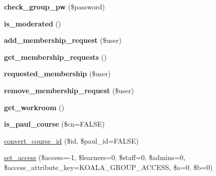 \begin{DoxyCompactItemize}
\item 
\hypertarget{classkoala__group__course_a1c4bd57f92b53d2d8645b126d37ef6d0}{
{\bfseries check\_\-group\_\-pw} (\$password)}
\label{classkoala__group__course_a1c4bd57f92b53d2d8645b126d37ef6d0}

\item 
\hypertarget{classkoala__group__course_af147d9619fe0800b4f804531ef75af8d}{
{\bfseries is\_\-moderated} ()}
\label{classkoala__group__course_af147d9619fe0800b4f804531ef75af8d}

\item 
\hypertarget{classkoala__group__course_a018460c2343e1da4f063cfec47a0a39b}{
{\bfseries add\_\-membership\_\-request} (\$user)}
\label{classkoala__group__course_a018460c2343e1da4f063cfec47a0a39b}

\item 
\hypertarget{classkoala__group__course_a6e8616015c70cac9f7fa6860d257d4ce}{
{\bfseries get\_\-membership\_\-requests} ()}
\label{classkoala__group__course_a6e8616015c70cac9f7fa6860d257d4ce}

\item 
\hypertarget{classkoala__group__course_a0a3d548b41e2e3fc5372e8434c55db25}{
{\bfseries requested\_\-membership} (\$user)}
\label{classkoala__group__course_a0a3d548b41e2e3fc5372e8434c55db25}

\item 
\hypertarget{classkoala__group__course_a2f8081ffd35e4ab86116dc7f71694616}{
{\bfseries remove\_\-membership\_\-request} (\$user)}
\label{classkoala__group__course_a2f8081ffd35e4ab86116dc7f71694616}

\item 
\hypertarget{classkoala__group__course_a03e4ebfe032ce112d12e6d2d2652e7c9}{
{\bfseries get\_\-workroom} ()}
\label{classkoala__group__course_a03e4ebfe032ce112d12e6d2d2652e7c9}

\item 
\hypertarget{classkoala__group__course_a176ccc49e2da25b063d638d50d35ef81}{
{\bfseries is\_\-paul\_\-course} (\$cn=FALSE)}
\label{classkoala__group__course_a176ccc49e2da25b063d638d50d35ef81}

\item 
\hyperlink{classkoala__group__course_a06c6fbf91391e641da3a49156cc4f1f0}{convert\_\-course\_\-id} (\$id, \$paul\_\-id=FALSE)
\item 
\hyperlink{classkoala__group__course_a9e9f86017b2d8467590bc77f5be87d42}{set\_\-access} (\$access=-\/1, \$learners=0, \$staff=0, \$admins=0, \$access\_\-attribute\_\-key=KOALA\_\-GROUP\_\-ACCESS, \$a=0, \$b=0)
\end{DoxyCompactItemize}
